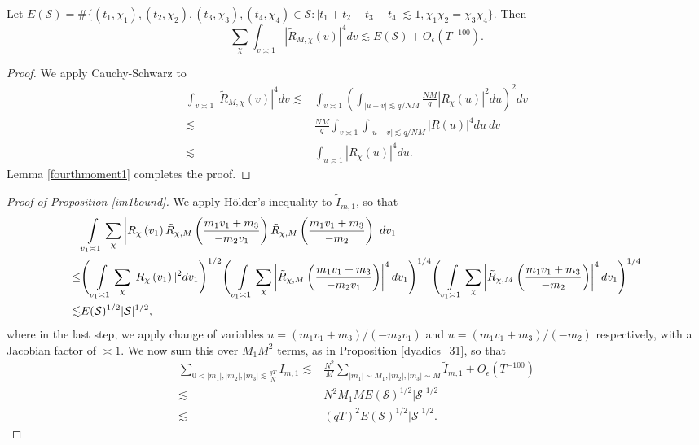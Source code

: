     \begin{lemma}\label{fourthmoment_smooth1}
        Let $E(\mathcal{S})=\#\{(t_1,\chi_1),(t_2,\chi_2),(t_3,\chi_3),(t_4,\chi_4)\in \mathcal{S}  :  |t_1+t_2-t_3-t_4|\lesssim 1, \chi_1\chi_2=\chi_3\chi_4\}$. Then \[
            \sum_{\chi} \int_{v\asymp 1} 
            \left|\tilde{R}_{M,\chi}\left(v\right)\right|^4dv \lesssim E(\mathcal{S}) + O_{\epsilon}(T^{-100}).
        \]
    \end{lemma}
    \begin{proof}
        We apply Cauchy-Schwarz to \begin{align*}
            \int_{v\asymp 1} 
            \left|\tilde{R}_{M,\chi}(v)\right|^4dv  \lesssim& \int_{v\asymp 1} 
            \left(\int_{|u-v|\lesssim q/NM}
            \frac{NM}{q}|R_{\chi}(u)|^2 du\right)^2
            dv \\
            \lesssim& \frac{NM}{q} \int_{v\asymp 1} 
           \int_{|u-v|\lesssim q/NM}
            |R(u)|^4 du \ 
            dv\\
            \lesssim&  
            \int_{u\asymp 1}
             |R_{\chi}(u)|^4 du.
        \end{align*}
        Lemma \ref{fourthmoment1} completes the proof.
    \end{proof}
\begin{proof}[Proof of Proposition \ref{im1bound}]
    We apply H\"older's inequality to $\tilde{I}_{m,1}$, so that \begin{align*}  
        &\int\displaylimits_{v_1\asymp 1} \sum_{\chi} \left|R_\chi\left(v_1\right) \tilde{R}_{\chi,M}\left(\frac{m_1v_1+m_3}{-m_2v_1}\right)
        \tilde{R}_{\chi,M}\left(\frac{m_1v_1+m_3}{-m_2}\right)\right|dv_1 \\\leq& 
        \Bigg(\int\displaylimits_{v_1\asymp 1} \sum_{\chi} |R_\chi\left(v_1\right)|^2 dv_1 \Bigg)^{1/2}
        \Bigg(\int\displaylimits_{v_1\asymp 1} \sum_{\chi} \left|\tilde{R}_{\chi,M}\left(\frac{m_1v_1+m_3}{-m_2v_1}\right)\right|^4dv_1 \Bigg)^{1/4}
        \Bigg(\int\displaylimits_{v_1\asymp 1} \sum_{\chi}\left| \tilde{R}_{\chi,M}\left(\frac{m_1v_1+m_3}{-m_2}\right)\right|^4dv_1 \Bigg)^{1/4}\\
        \lesssim & E(\mathcal{S})^{1/2}|\mathcal{S}|^{1/2},
    \end{align*}
    where in the last step, we apply change of variables $u=(m_1v_1+m_3)/(-m_2v_1)$ and $u=(m_1v_1+m_3)/(-m_2)$ respectively, with a Jacobian factor of $\asymp 1$.
    We now sum this over $M_1M^2$ terms, as in Proposition \ref{dyadics_31},
    so that \begin{align*}
        \sum_{0<|m_1|,|m_2|,|m_3|\lesssim \frac{qT}{N}} I_{m,1}\lesssim& \frac{N^2}{M}\sum_{|m_1|\sim M_1,|m_2|,|m_3|\sim M}\tilde{I}_{m,1}+O_\epsilon(T^{-100})\\
        \lesssim & N^2M_1ME(\mathcal{S})^{1/2}|\mathcal{S}|^{1/2}\\
        \lesssim & (qT)^2E(\mathcal{S})^{1/2}|\mathcal{S}|^{1/2}.
    \end{align*}
\end{proof}

